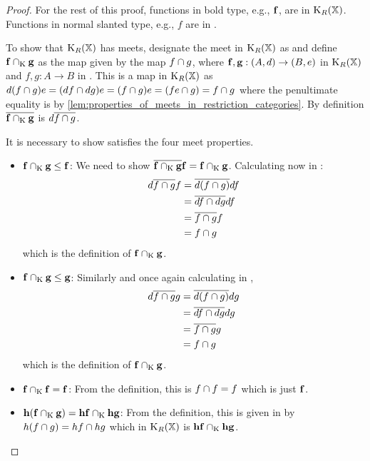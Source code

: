 \begin{proof}
  For the rest of this proof, functions in bold type, e.g., $\mathbf{f}$, are in $\text{K}_{R}(\mathbb{X})$.
  Functions in normal slanted type, e.g., $f$ are in \X.

  To show that $\text{K}_{R}(\mathbb{X})$ has meets,  designate the meet in $\text{K}_{R}(\mathbb{X})$ as \meetspl
  and define $\mathbf{f} \cap_{\text{K}} \mathbf{g}$ as the map given by the \X map $f \cap g$, where
  $\mathbf{f},\mathbf{g}:(A,d)\to(B,e)$ in $\text{K}_{R}(\mathbb{X})$ and $f,g:A\to B$ in \X . This is
  a map in $\text{K}_{R}(\mathbb{X})$ as
  $d(f \cap g)e = (d\hspace{0.1pt} f \cap d\hspace{0.1pt} g) e = (f \cap g) e = (f e \cap g) = f\cap g$
  where the penultimate equality is by
  \ref{lem:properties_of_meets_in_restriction_categories}.
  By definition $\overline{\mathbf{f} \cap_{\text{K}} \mathbf{g} }$ is $d\overline{f\cap g}$.

  It is necessary to show \meetspl satisfies the four meet properties.
  \begin{itemize}
    \item{$\mathbf{f}\cap_{\text{K}} \mathbf{g} \le \mathbf{f}$: } We need to show
      $\overline{\mathbf{f} \cap_{\text{K}} \mathbf{g}} \mathbf{f} =  \mathbf{f} \cap_{\text{K}} \mathbf{g}$.  Calculating now in \X:
      \begin{align*}
        d \overline{f \cap g} f&= \overline{d(f\cap g)} d f\\
        & = \overline{d f \cap d g} d f \\
        & = \overline{f \cap g} f \\
        & = f \cap g
      \end{align*}
      which is the definition of $\mathbf{f} \cap_{\text{K}} \mathbf{g}$.
    \item{$\mathbf{f}\cap_{\text{K}} \mathbf{g} \le \mathbf{g}$: } Similarly and once again calculating in \X,
      \begin{align*}
        d \overline{f \cap g} g&= \overline{d(f\cap g)} d g\\
        & = \overline{d f \cap d g} d g \\
        & = \overline{f \cap g} g \\
        & = f \cap g
      \end{align*}
      which is the definition of $\mathbf{f} \cap_{\text{K}} \mathbf{g}$.
    \item{$\mathbf{f}\cap_{\text{K}} \mathbf{f} = \mathbf{f}$: } From the definition, this is $f \cap f = f$ which
      is just $ \mathbf{f}$.
    \item{$\mathbf{h}(\mathbf{f}\cap_{\text{K}} \mathbf{g}) = \mathbf{h}\mathbf{f} \cap_{\text{K}} \mathbf{h}\mathbf{g}$: }
      From the definition, this is given in \X by $ h (f \cap g) =
      h f \cap h g$ which in $\text{K}_{R}(\mathbb{X})$ is $\mathbf{h}\mathbf{f} \cap_{\text{K}} \mathbf{h}\mathbf{g}$.
  \end{itemize}
\end{proof}



